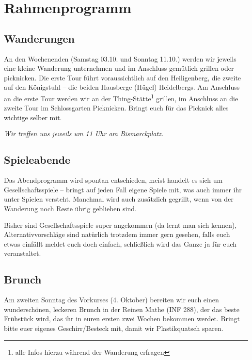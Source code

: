 \section{Rahmenprogramm}
\subsection{Wanderungen}
An den Wochenenden (Samstag 03.10. und Sonntag 11.10.) werden wir jeweils eine
kleine Wanderung unternehmen und im Anschluss gemütlich grillen oder
picknicken. Die erste Tour führt voraussichtlich auf den Heiligenberg, die
zweite auf den Königstuhl -- die beiden Hausberge (Hügel) Heidelbergs. Am
Anschluss an die erste Tour werden wir an der Thing-Stätte\footnote{alle Infos
hierzu während der Wanderung erfragen} grillen, im Anschluss an die zweite Tour
im Schlossgarten Picknicken.  Bringt euch für das Picknick alles wichtige
selber mit.

\noindent\emph{Wir treffen uns jeweils um 11 Uhr am Bismarckplatz.}

\subsection{Spieleabende}
Das Abendprogramm wird spontan entschieden, meist handelt es sich um Gesellschaftsspiele -- bringt auf jeden Fall eigene Spiele mit, was auch immer ihr unter Spielen versteht. Manchmal wird auch zusätzlich gegrillt, wenn von der Wanderung noch Reste übrig geblieben sind.

Bisher sind Gesellschaftsspiele super angekommen (da lernt man sich kennen), Alternativvorschläge sind natürlich trotzdem immer gern gesehen, falls euch etwas einfällt meldet euch doch einfach, schließlich wird das Ganze ja für euch veranstaltet.

\subsection{Brunch}
Am zweiten Sonntag des Vorkurses (4. Oktober) bereiten wir euch einen
wunderschönen, leckeren Brunch in der Reinen Mathe (\gls{INF} 288), der das
beste Frühstück wird, das ihr in euren ersten zwei Wochen bekommen werdet.
Bringt bitte euer eigenes Geschirr/Besteck mit, damit wir Plastikquatsch
sparen.

\iffalse
